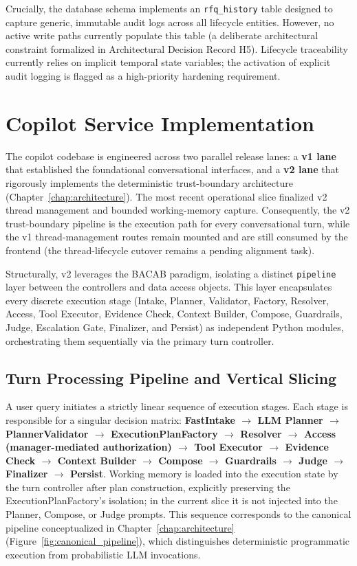 Crucially, the database schema implements an \texttt{rfq\_history} table designed to capture generic, immutable audit logs across all lifecycle entities. However, no active write paths currently populate this table (a deliberate architectural constraint formalized in Architectural Decision Record H5). Lifecycle traceability currently relies on implicit temporal state variables; the activation of explicit audit logging is flagged as a high-priority hardening requirement.

\section{Copilot Service Implementation}\label{sec:copilot_impl}
The copilot codebase is engineered across two parallel release lanes: a \textbf{v1 lane} that established the foundational conversational interfaces, and a \textbf{v2 lane} that rigorously implements the deterministic trust-boundary architecture (Chapter~\ref{chap:architecture}). The most recent operational slice finalized v2 thread management and bounded working-memory capture. Consequently, the v2 trust-boundary pipeline is the execution path for every conversational turn, while the v1 thread-management routes remain mounted and are still consumed by the frontend (the thread-lifecycle cutover remains a pending alignment task).

Structurally, v2 leverages the BACAB paradigm, isolating a distinct \texttt{pipeline} layer between the controllers and data access objects. This layer encapsulates every discrete execution stage (Intake, Planner, Validator, Factory, Resolver, Access, Tool Executor, Evidence Check, Context Builder, Compose, Guardrails, Judge, Escalation Gate, Finalizer, and Persist) as independent Python modules, orchestrating them sequentially via the primary turn controller.

\subsection{Turn Processing Pipeline and Vertical Slicing}
A user query initiates a strictly linear sequence of execution stages. Each stage is responsible for a singular decision matrix: \textbf{FastIntake $\rightarrow$ LLM Planner $\rightarrow$ PlannerValidator $\rightarrow$ ExecutionPlanFactory $\rightarrow$ Resolver $\rightarrow$ Access (manager-mediated authorization) $\rightarrow$ Tool Executor $\rightarrow$ Evidence Check $\rightarrow$ Context Builder $\rightarrow$ Compose $\rightarrow$ Guardrails $\rightarrow$ Judge $\rightarrow$ Finalizer $\rightarrow$ Persist}. Working memory is loaded into the execution state by the turn controller after plan construction, explicitly preserving the ExecutionPlanFactory's isolation; in the current slice it is not injected into the Planner, Compose, or Judge prompts. This sequence corresponds to the canonical pipeline conceptualized in Chapter~\ref{chap:architecture} (Figure~\ref{fig:canonical_pipeline}), which distinguishes deterministic programmatic execution from probabilistic LLM invocations.

